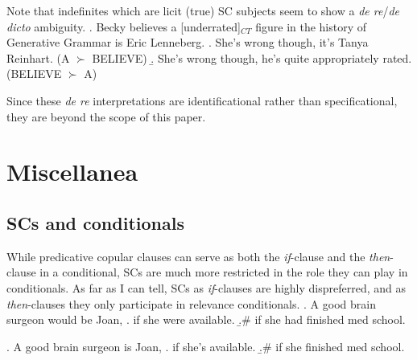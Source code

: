 \documentclass[letterpaper]{article}
\begin{document}
Note that indefinites which are licit (true) SC subjects seem to show a \textit{de re}/\textit{de dicto} ambiguity.
\ex. Becky believes a [underrated]$_{CT}$ figure in the history of Generative Grammar is Eric Lenneberg.
	\a. She's wrong though, it's Tanya Reinhart. (A $\succ$ BELIEVE)
	\b. She's wrong though, he's quite appropriately rated. (BELIEVE $\succ$ A)

Since these \textit{de re} interpretations are identificational rather than specificational, they are beyond the scope of this paper.

\section{Miscellanea}
\subsection{SCs and conditionals}
While predicative copular clauses can serve as both the \textit{if}-clause and the \textit{then}-clause in a conditional, SCs are much more restricted in the role they can play in conditionals.
As far as I can tell, SCs as \textit{if}-clauses are highly dispreferred, and as \textit{then}-clauses they only participate in relevance conditionals.
\ex. A good brain surgeon would be Joan,
\a. if she were available.
\b.\# if she had finished med school.

\ex. A good brain surgeon is Joan,
\a. if she's available.
\b.\# if she finished med school.

\printbibliography
\end{document}
